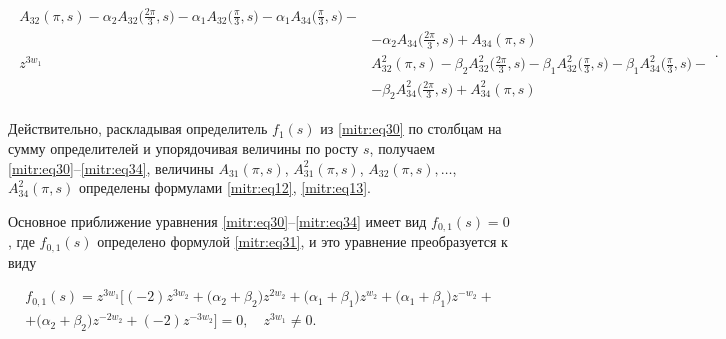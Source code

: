\begin{lemma}[5]
\begin{gather}
\begin{array}{|lr|}
A_{32}(\pi,s){-}\alpha_2A_{32}\big(\frac{2\pi}3,s\big){-}

\alpha_1A_{32}\big(\frac\pi3,s\big){-}

\alpha_1A_{34}\big(\frac\pi3,s\big){-}\\

&{-}\alpha_2A_{34}\big(\frac{2\pi}3,s\big)

{+}A_{34}(\pi,s)\\[2mm]

z^{3w_1} &

A^2_{32}(\pi,s){-}\beta_2A^2_{32}\big(\frac{2\pi}3,s\big){-}

\beta_1A^2_{32}\big(\frac\pi3,s\big){-}

\beta_1A^2_{34}\big(\frac\pi3,s\big)-\\

&{-}\beta_2A^2_{34}\big(\frac{2\pi}3,s\big)

{+}A^2_{34}(\pi,s)

\end{array}.

\end{gather}

\end{lemma}



\smallskip



Действительно, раскладывая определитель $f_1(s)$ из \eqref{mitr:eq30} по столбцам на сумму определителей и упорядочивая величины по росту $s$, получаем \eqref{mitr:eq30}--\eqref{mitr:eq34}, величины $A_{31}(\pi,s)$, $A^2_{31}(\pi,s)$, $A_{32}(\pi,s),\dots$, $A^2_{34}(\pi,s)$ определены формулами \eqref{mitr:eq12}, \eqref{mitr:eq13}.



Основное приближение уравнения \eqref{mitr:eq30}--\eqref{mitr:eq34} имеет вид $f_{0,1}(s)=0$, где $f_{0,1}(s)$ определено формулой \eqref{mitr:eq31}, и это уравнение преобразуется к виду 

\begin{multline}

f_{0,1}(s)=z^{3w_1}\Big[(-2)z^{3w_2}+\big(\alpha_2+\beta_2\big)z^{2w_2}+

\big(\alpha_1+\beta_1\big)z^{w_2} +

\big(\alpha_1+\beta_1\big)z^{-w_2}+ \\+

\big(\alpha_2+\beta_2\big)z^{-2w_2}

+(-2)z^{-3w_2}\Big]=0,\quad  z^{3w_1}\ne0.

\end{multline}


